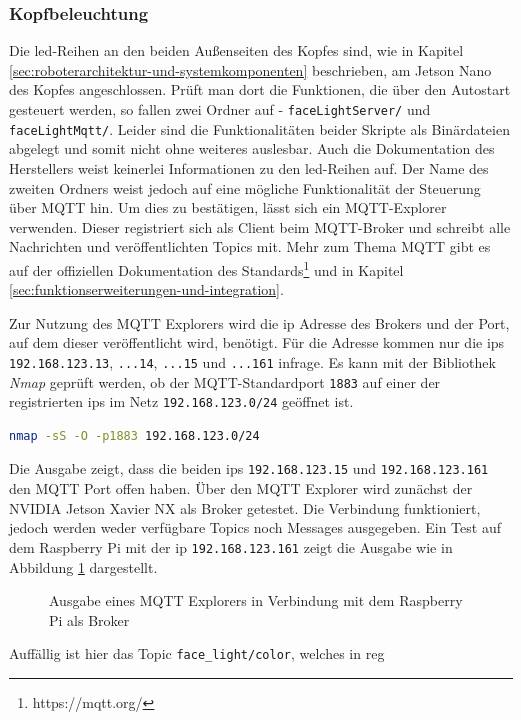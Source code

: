 \subsubsection{Kopfbeleuchtung}
\label{subsubsec:led}

Die \gls{led}-Reihen an den beiden Außenseiten des Kopfes sind, wie in Kapitel \ref{sec:roboterarchitektur-und-systemkomponenten}
beschrieben, am Jetson Nano des Kopfes angeschlossen.
Prüft man dort die Funktionen, die über den Autostart gesteuert werden, so fallen zwei Ordner auf - \texttt{faceLightServer/}
und \texttt{faceLightMqtt/}.
Leider sind die Funktionalitäten beider Skripte als Binärdateien abgelegt und somit nicht ohne weiteres auslesbar.
Auch die Dokumentation des Herstellers weist keinerlei Informationen zu den \gls{led}-Reihen auf.
Der Name des zweiten Ordners weist jedoch auf eine mögliche Funktionalität der Steuerung über MQTT hin.
Um dies zu bestätigen, lässt sich ein MQTT-Explorer verwenden.
Dieser registriert sich als Client beim MQTT-Broker und schreibt alle Nachrichten und veröffentlichten Topics mit.
Mehr zum Thema MQTT gibt es auf der offiziellen Dokumentation des Standards\footnote{https://mqtt.org/} und in Kapitel \ref{sec:funktionserweiterungen-und-integration}.

Zur Nutzung des MQTT Explorers wird die \gls{ip} Adresse des Brokers und der Port, auf dem dieser veröffentlicht wird, benötigt.
Für die Adresse kommen nur die \glspl{ip} \texttt{192.168.123.13}, \texttt{...14}, \texttt{...15} und \texttt{...161}
infrage.
Es kann mit der Bibliothek \emph{Nmap} geprüft werden, ob der MQTT-Standardport \texttt{1883} auf einer der registrierten \glspl{ip}
im Netz \texttt{192.168.123.0/24} geöffnet ist.

\begin{lstlisting}[language=Bash]
nmap -sS -O -p1883 192.168.123.0/24
\end{lstlisting}

\noindent Die Ausgabe zeigt, dass die beiden \glspl{ip}
\texttt{192\allowbreak .168\allowbreak .123\allowbreak .15} und \texttt{192\allowbreak .168\allowbreak .123\allowbreak .161} den MQTT Port offen haben.
Über den MQTT Explorer wird zunächst der NVIDIA Jetson Xavier NX als Broker getestet.
Die Verbindung funktioniert, jedoch werden weder verfügbare Topics noch Messages ausgegeben.
Ein Test auf dem Raspberry Pi mit der \gls{ip} \texttt{192.168.123.161} zeigt die Ausgabe wie in Abbildung \ref{fig:mqtt-explorer}
dargestellt.

\begin{figure}[h]
    \caption{Ausgabe eines MQTT Explorers in Verbindung mit dem Raspberry Pi als Broker}\label{fig:mqtt-explorer}
\end{figure}

\noindent Auffällig ist hier das Topic \texttt{face\_light/\allowbreak color}, welches in reg

